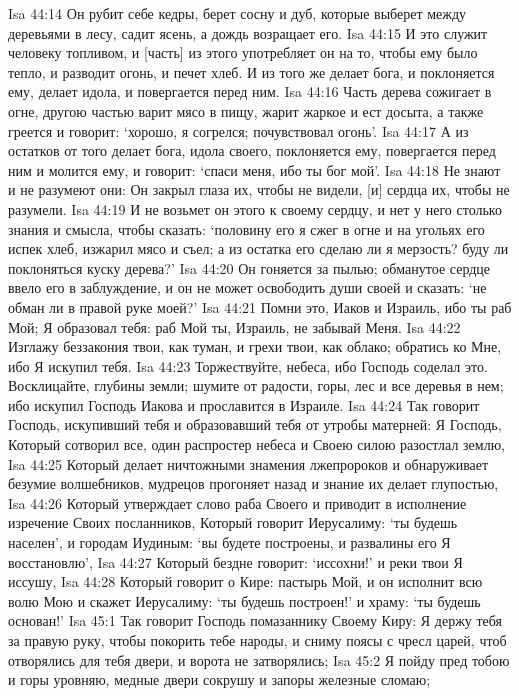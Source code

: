 Isa 44:14  Он рубит себе кедры, берет сосну и дуб, которые выберет между деревьями в лесу, садит ясень, а дождь возращает его.
Isa 44:15  И это служит человеку топливом, и [часть] из этого употребляет он на то, чтобы ему было тепло, и разводит огонь, и печет хлеб. И из того же делает бога, и поклоняется ему, делает идола, и повергается перед ним.
Isa 44:16  Часть дерева сожигает в огне, другою частью варит мясо в пищу, жарит жаркое и ест досыта, а также греется и говорит: `хорошо, я согрелся; почувствовал огонь'.
Isa 44:17  А из остатков от того делает бога, идола своего, поклоняется ему, повергается перед ним и молится ему, и говорит: `спаси меня, ибо ты бог мой'.
Isa 44:18  Не знают и не разумеют они: Он закрыл глаза их, чтобы не видели, [и] сердца их, чтобы не разумели.
Isa 44:19  И не возьмет он этого к своему сердцу, и нет у него столько знания и смысла, чтобы сказать: `половину его я сжег в огне и на угольях его испек хлеб, изжарил мясо и съел; а из остатка его сделаю ли я мерзость? буду ли поклоняться куску дерева?'
Isa 44:20  Он гоняется за пылью; обманутое сердце ввело его в заблуждение, и он не может освободить души своей и сказать: `не обман ли в правой руке моей?'
Isa 44:21  Помни это, Иаков и Израиль, ибо ты раб Мой; Я образовал тебя: раб Мой ты, Израиль, не забывай Меня.
Isa 44:22  Изглажу беззакония твои, как туман, и грехи твои, как облако; обратись ко Мне, ибо Я искупил тебя.
Isa 44:23  Торжествуйте, небеса, ибо Господь соделал это. Восклицайте, глубины земли; шумите от радости, горы, лес и все деревья в нем; ибо искупил Господь Иакова и прославится в Израиле.
Isa 44:24  Так говорит Господь, искупивший тебя и образовавший тебя от утробы матерней: Я Господь, Который сотворил все, один распростер небеса и Своею силою разостлал землю,
Isa 44:25  Который делает ничтожными знамения лжепророков и обнаруживает безумие волшебников, мудрецов прогоняет назад и знание их делает глупостью,
Isa 44:26  Который утверждает слово раба Своего и приводит в исполнение изречение Своих посланников, Который говорит Иерусалиму: `ты будешь населен', и городам Иудиным: `вы будете построены, и развалины его Я восстановлю',
Isa 44:27  Который бездне говорит: `иссохни!' и реки твои Я иссушу,
Isa 44:28  Который говорит о Кире: пастырь Мой, и он исполнит всю волю Мою и скажет Иерусалиму: `ты будешь построен!' и храму: `ты будешь основан!'
Isa 45:1  Так говорит Господь помазаннику Своему Киру: Я держу тебя за правую руку, чтобы покорить тебе народы, и сниму поясы с чресл царей, чтоб отворялись для тебя двери, и ворота не затворялись;
Isa 45:2  Я пойду пред тобою и горы уровняю, медные двери сокрушу и запоры железные сломаю;
